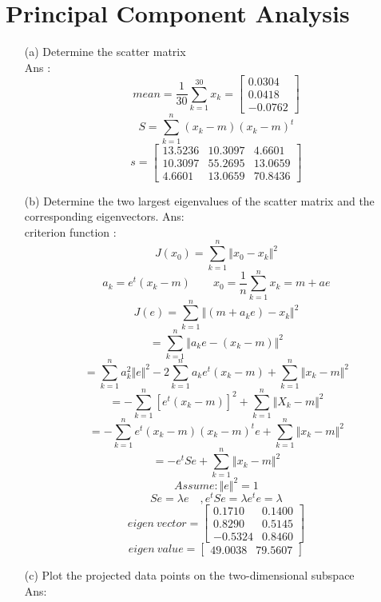 \documentclass[14pt]{report}
\begin{document}
	\section{Principal Component Analysis}
	\begin{enumerate}
		\item [(a)]Determine the scatter matrix \\
		Ans : \\
		\[mean=\frac{1}{30}\sum_{k=1}^{30}x_k=\left[
		\begin{array}{clr}0.0304 \\ 0.0418 \\ -0.0762\end{array} \right] \]
		\[S=\sum_{k=1}^{n}(x_k-m)(x_k-m)^t \]
		\[s=\left[
		\begin{array}{clr}13.5236 & 10.3097 & 4.6601 \\ 10.3097 & 55.2695 & 13.0659 \\ 4.6601 & 13.0659 & 70.8436\end{array} \right] \]
		\item [(b)]Determine the two largest eigenvalues of the scatter matrix and the corresponding eigenvectors.
		Ans: \\
		criterion function : \[J(x_0)=\sum_{k=1}^{n}\Vert x_0-x_k\Vert^2 \]
		\[a_k=e^t(x_k-m) \qquad x_0=\frac{1}{n}\sum_{k=1}^{n}x_k=m+ae\]
		\[J(e)=\sum_{k=1}^{n}\Vert(m+a_ke)-x_k\Vert^2 \]
		\[=\sum_{k=1}^{n}\Vert a_ke-(x_k-m)\Vert^2 \]
		\[=\sum_{k=1}^{n}a_k^2\Vert e\Vert^2-2\sum_{k=1}^{n}a_ke^t(x_k-m)+\sum_{k=1}^{n}\Vert x_k-m\Vert^2 \]
		\[=-\sum_{k=1}^{n}[e^t(x_k-m)]^2+\sum_{k=1}^{n}\Vert X_k-m\Vert^2 \]
		\[=-\sum_{k=1}^{n}e^t(x_k-m)(x_k-m)^te+\sum_{k=1}^{n}\Vert x_k-m\Vert^2 \]
		\[=-e^tSe+\sum_{k=1}^{n}\Vert x_k-m\Vert^2 \]
		\[Assume :\Vert e\Vert^2=1 \]
		\[Se=\lambda e\quad ,e^tSe=\lambda e^te=\lambda \]
		\[eigen\ vector=\left[\begin{array}{clr}0.1710 & 0.1400 \\ 0.8290 & 0.5145 \\ -0.5324 &  0.8460\end{array} \right]\]
		\[eigen\ value=\left[\begin{array}{clr}49.0038 & 79.5607\end{array} \right] \]
		\item [(c)]Plot the projected data points on the two-dimensional subspace \\
		 Ans:\\

\end{enumerate}
\end{document}
